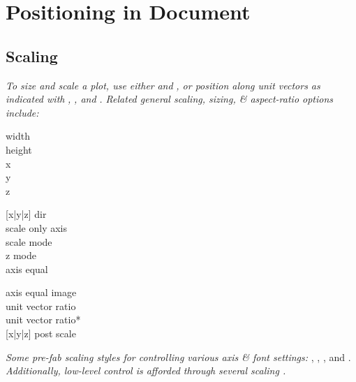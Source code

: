 \section{Positioning in Document}



\subsection*{Scaling}


\textit{To size and scale a plot, use either }\href{\docurl\#pgfp./pgfplots/width}{}\textit{ and }\href{\docurl\#pgfp./pgfplots/height}{}\textit{, or position along unit vectors as indicated with }\href{\docurl\#pgfp./pgfplots/x}{}\textit{, }\href{\docurl\#pgfp./pgfplots/y}{}\textit{, and }\href{\docurl\#pgfp./pgfplots/z}{}\textit{. Related general scaling, sizing, \& aspect-ratio options include:}\\
{\color{blue}
\begin{minipage}[t]{1.2cm}
width\\
height\\
x\\
y\\
z
\end{minipage}
\begin{minipage}[t]{2.2cm}
[x|y|z] dir\\
scale only axis\\
scale mode\\
z mode\\
axis equal
\end{minipage}
\begin{minipage}[t]{3.3cm}
axis equal image\\
unit vector ratio\\
unit vector ratio*\\
{[x|y|z]} post scale
\end{minipage}}


\textit{Some pre-fab scaling styles for controlling various axis \& font settings: }\href{\docurl\#pgfp./pgfplots/scale:mode}{}, \href{\docurl\#pgfp./pgfplots/scale:mode}{}, \href{\docurl\#pgfp./pgfplots/scale:mode}{}, and \href{\docurl\#pgfp./pgfplots/scale:mode}{}.\\

\textit{Additionally, low-level control is afforded through several scaling .}

